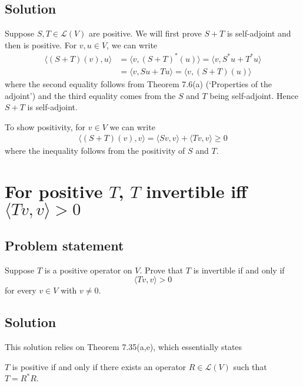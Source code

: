\documentclass{article}
\begin{document}
\subsection*{Solution}
Suppose $S,T\in\mathcal{L}(V)$ are positive. We will first prove $S+T$ is self-adjoint and then is positive. For $v,u\in V$, we can write
\begin{align*}
    \langle (S+T)(v),u\rangle&=\langle v,(S+T)^*(u)\rangle=\langle v,S^*u+T^*u\rangle\\
    &=\langle v,Su+Tu\rangle=\langle v,(S+T)(u)\rangle
\end{align*}
where the second equality follows from Theorem 7.6(a) (`Properties of the adjoint') and the third equality comes from the $S$ and $T$ being self-adjoint. Hence $S+T$ is self-adjoint.

To show positivity, for $v\in V$ we can write
\begin{align*}
    \langle (S+T)(v),v\rangle = \langle Sv,v\rangle+\langle Tv,v\rangle\geq 0
\end{align*}
where the inequality follows from the positivity of $S$ and $T$.

\clearpage

\renewcommand{\thesection}{7}
\section{For positive $T$, $T$ invertible iff $\langle Tv,v\rangle > 0$}
\subsection*{Problem statement}
Suppose $T$ is a positive operator on $V$. Prove that $T$ is invertible if and only if
\[\langle Tv,v\rangle > 0\]
for every $v\in V$ with $v\neq 0$.

\subsection*{Solution}
This solution relies on Theorem 7.35(a,e), which essentially states 
\begin{displayquote}
$T$ is positive if and only if there exists an operator $R\in\mathcal{L}(V)$ such that $T=R^*R$.
\end{displayquote}
\end{document}
